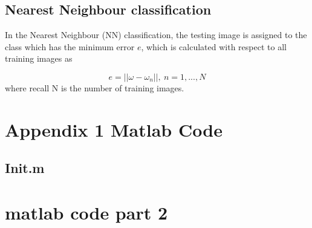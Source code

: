 \documentclass[10pt,twocolumn,letterpaper]{article}
\begin{document}
\subsection{Nearest Neighbour classification}
In the Nearest Neighbour (NN) classification, the testing image is assigned to the class which has the minimum error $e$, which is calculated with respect to all training images as

\begin{equation}
	e = || \omega - \omega_n||, ~ n = 1, ..., N
\end{equation}
where recall N is the number of training images. 
	

{\small


}

\onecolumn
\appendix
\section{Appendix 1 Matlab Code}
\subsection{Init.m}


\section{matlab code part 2}

\end{document}
